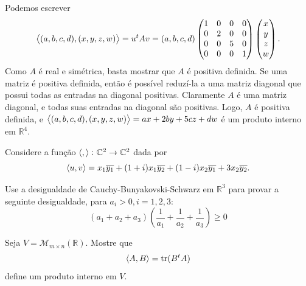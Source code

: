 \documentclass[11pt,a4paper]{article}
\begin{document}
{\begin{itemize}
{    
    \task[\pers{a}] Podemos escrever
    \[
    \left\langle (a,b,c,d), (x,y,z,w) \right\rangle = u^t A v = (a,b,c,d) \begin{pmatrix}
    1 & 0 & 0 & 0 \\
    0 & 2 & 0 & 0 \\
    0 & 0 & 5 & 0 \\
    0 & 0 & 0 & 1 \\
    \end{pmatrix} \begin{pmatrix}
    x\\ y\\ z \\ w
    \end{pmatrix}.
    \]
    Como $A$ é real e simétrica, basta mostrar que $A$ é positiva definida. Se uma matriz é positiva definida, então é possível reduzí-la a uma matriz diagonal que possui todas as entradas na diagonal positivas. Claramente $A$ é uma matriz diagonal, e todas suas entradas na diagonal são positivas. Logo, $A$ é positiva definida, e $\left\langle (a,b,c,d), (x,y,z,w) \right\rangle = ax + 2by + 5cz + dw$ é um produto interno em $\mathbb{R}^4.$
    
    \task[\pers{b}]
    }
    
\end{itemize}


}

 Considere a função $\left\langle , \right\rangle \colon \mathbb{C}^2 \to \mathbb{C}^2$ dada por
\[
\left\langle u,v \right\rangle = x_1\overline{y_1} + (1+i)x_1\overline{y_2} + (1-i)x_2\overline{y_1} + 3x_2\overline{y_2}.
\]

\solucao{}

 Use a desigualdade de Cauchy-Bunyakovski-Schwarz em $\mathbb{R}^3$ para provar a seguinte desigualdade, para $a_i > 0, i = 1,2,3:$
\[
(a_1 + a_2 + a_3) \left( \frac{1}{a_1} + \frac{1}{a_2} + \frac{1}{a_3} \right) \ge 0
\]


 Seja $V = \mathcal{M}_{m \times n}(\mathbb{R}).$ Mostre que \[\left\langle A,B \right\rangle = \mathrm{tr }(B^tA) \] define um produto interno em $V.$

\solucao{}
\end{document}
